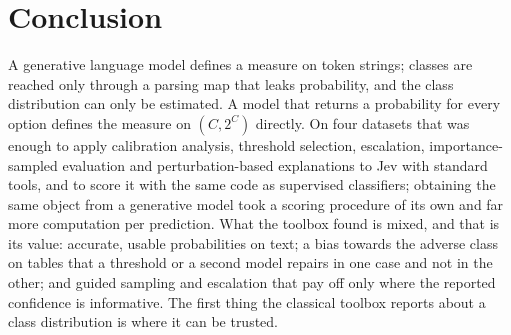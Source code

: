 \section{Conclusion}
\label{sec:conclusion}

A generative language model defines a measure on token strings; classes are reached only through
a parsing map that leaks probability, and the class distribution can only be estimated. A model
that returns a probability for every option defines the measure on $(C, 2^C)$ directly. On four
datasets that was enough to apply calibration analysis, threshold selection, escalation,
importance-sampled evaluation and perturbation-based explanations to Jev with standard tools,
and to score it with the same code as supervised classifiers; obtaining the same object from a
generative model took a scoring procedure of its own and far more computation per prediction.
What the toolbox found is mixed, and that is its value: accurate, usable probabilities on text;
a bias towards the adverse class on tables that a threshold or a second model repairs in one
case and not in the other; and guided sampling and escalation that pay off only where the
reported confidence is informative. The first thing the classical toolbox reports about a class
distribution is where it can be trusted.
